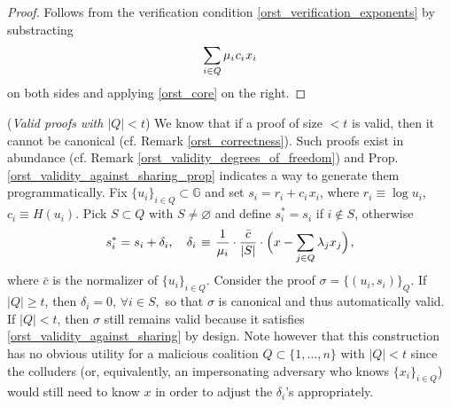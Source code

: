 \documentclass{iacrtrans}
\begin{document}
\begin{proof}
Follows from the verification condition
\eqref{orst_verification_exponents}
by substracting
\vspace{5pt}
\begin{equation*}
\sum_{i \in Q} \mu_i\hspace{0.5pt}c_i\hspace{0.5pt}x_i
\vspace{5pt}
\end{equation*}
on both sides and applying \eqref{orst_core}
on the right.
\end{proof}

\begin{rem}\label{orst_valid_below_rem}
(\textit{Valid proofs with $|Q| < t$})
We know that if a proof of size $<t$ is valid,
then it cannot be canonical (cf. Remark \ref{orst_correctness}).
Such proofs exist in abundance
(cf. Remark \ref{orst_validity_degrees_of_freedom})
and Prop. \ref{orst_validity_against_sharing_prop}
indicates a way to generate them programmatically.
Fix $\{u_i\}_{i \in Q} \subset \mathbb{G}$
and set $s_i = r_i + c_i\hspace{1pt}x_i$, where
$r_i \equiv \log u_i$, $c_i \equiv H(u_i)$.
Pick $S \subset Q$ with $S \neq \varnothing$
and define
$s_i^* = s_i$ if $i \not \in S$, otherwise
\vspace{5pt}
\begin{equation*}
s_i^* = s_i + \delta_i,
\ \ \ \delta_i
	\hspace{1pt}
	\equiv
	\hspace{1pt}
	\frac{1}{\mu_i}
	\cdot
	\frac{\bar{c}}{|S|}
	\cdot
	\Big(
		x
		-
		\sum_{j \in Q} \lambda_j x_j
	\Big)
	\hspace{1pt}
	,
\vspace{5pt}
\end{equation*}
where $\bar{c}$ is the normalizer of $\{u_i\}_{i \in Q}$.
Consider the proof $\sigma = \{(u_i, s_i)\}_{Q}$.
If $|Q| \ge t$, then $\delta_i = 0,\hspace{2pt} \forall i \in S,$
so that $\sigma$ is canonical and thus automatically valid.
If $|Q| < t$, then $\sigma$ still remains valid because
it satisfies \eqref{orst_validity_against_sharing}
by design.
Note however that this construction has no obvious utility
for a malicious coalition $Q \subset \{1, \dots, n\}$
with $|Q| < t$ since the colluders
(or, equivalently, an impersonating adversary
who knows $\{x_i\}_{i \in Q}$)
would still need to know $x$ in order to adjust
the $\delta_i$'s appropriately.
\end{rem}
\end{document}
